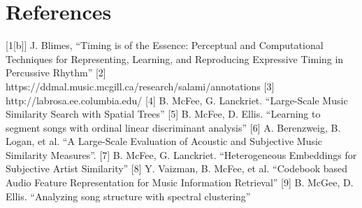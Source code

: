 \documentclass[11pt, twocolumn]{article}
\begin{document}
\section{References}
[1[b]] J. Blimes, “Timing is of the Essence: Perceptual and Computational Techniques for
      Representing, Learning, and Reproducing Expressive Timing in Percussive Rhythm”
[2]        https://ddmal.music.mcgill.ca/research/salami/annotations
[3]        http://labrosa.ee.columbia.edu/
[4]        B. McFee, G. Lanckriet. “Large-Scale Music Similarity Search with Spatial Trees”
[5]        B. McFee, D. Ellis. “Learning to segment songs with ordinal linear discriminant analysis”
[6]         A. Berenzweig, B. Logan, et al. “A Large-Scale Evaluation of Acoustic and Subjective
      Music Similarity Measures”.
[7]        B. McFee, G. Lanckriet. “Heterogeneous Embeddings for Subjective Artist Similarity”
[8]        Y. Vaizman, B. McFee, et al. “Codebook based Audio Feature Representation for Music
      Information Retrieval”
[9]        B. McGee, D. Ellis. “Analyzing song structure with spectral clustering”
\end{document}
